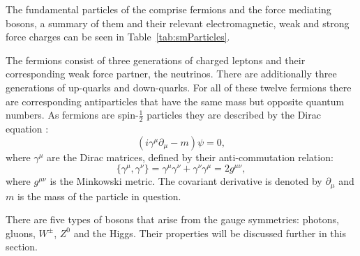 The fundamental particles of the \SM comprise fermions and the force
mediating bosons, a summary of them and their relevant
electromagnetic, weak and strong force charges can be seen in
Table~\ref{tab:smParticles}. 

The fermions consist of three generations of charged leptons and their
corresponding weak force partner, the neutrinos. There are
additionally three generations of up-quarks and down-quarks. For all
of these twelve fermions there are corresponding antiparticles that
have the same mass but opposite quantum numbers. As fermions are
spin-$\frac{1}{2}$ particles they are described by the Dirac equation
\cite{Griffiths:111880}:
\begin{equation}
(i\gamma^{\mu}\partial_{\mu}-m)\psi=0,
\end{equation}
where $\gamma^{\mu}$ are the Dirac matrices, defined by their
anti-commutation relation:
\begin{equation}
\{\gamma^{\mu},\gamma^{\nu}\}=\gamma^{\mu}\gamma^{\nu}+\gamma^{\nu}\gamma^{\mu}=2g^{\mu\nu},
\end{equation}
where $g^{\mu\nu}$ is the Minkowski metric. The covariant derivative is denoted
by $\partial_{\mu}$ and $m$ is the mass of the particle in question.

There are five types of bosons that arise from the \SM gauge
symmetries: photons, gluons, $W^{\pm}$, $Z^0$ and the Higgs. Their
properties will be discussed further in this section.

